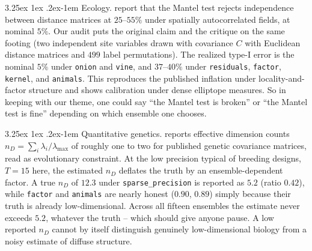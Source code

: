 \documentclass[11pt]{article}
\makeatletter
\renewcommand\paragraph{\@startsection{paragraph}{4}{\z@}%
  {3.25ex \@plus1ex \@minus.2ex}{-1em}%
  {\normalfont\normalsize\itshape}}
\makeatother
\begin{document}
\paragraph{Ecology.} \citet{guillot2013} report that the Mantel test
\citep{mantel1967} rejects independence between distance matrices at $25$--$55\%$ under
spatially autocorrelated fields, at nominal $5\%$. Our audit puts the
original claim and the critique on the same footing (two independent site
variables drawn with covariance $C$ with Euclidean distance matrices and $499$
label permutations). The realized type-I error is the nominal $5\%$ under
\texttt{onion} and \texttt{vine}, and $37$--$40\%$ under
\texttt{residuals}, \texttt{factor}, \texttt{kernel}, and
\texttt{animals}. This reproduces the published inflation under
locality-and-factor structure and shows calibration under dense elliptope
measures. So in keeping with our theme, one could say ``the Mantel test is broken'' or ``the Mantel test is
fine'' depending on which ensemble one chooses.

\paragraph{Quantitative genetics.} \citet{kirkpatrick2009} reports effective
dimension counts $n_D=\sum_i\lambda_i/\lambda_{\max}$ of roughly one to
two for published genetic covariance matrices, read as evolutionary
constraint. At the low precision typical of breeding designs, $T=15$
here, the estimated $n_D$ deflates the truth by an ensemble-dependent
factor. A true $n_D$ of $12.3$ under \texttt{sparse\_precision} is
reported as $5.2$ (ratio $0.42$), while \texttt{factor} and
\texttt{animals} are nearly honest ($0.90$, $0.89$) simply because their truth
is already low-dimensional. Across all fifteen ensembles the estimate
never exceeds $5.2$, whatever the truth -- which should give anyone pause. A low reported $n_D$ cannot by
itself distinguish genuinely low-dimensional biology from a noisy estimate of
diffuse structure.
\end{document}
